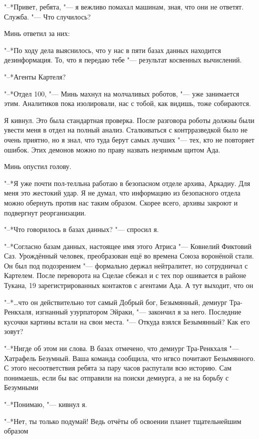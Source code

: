 \documentclass[a4paper,10pt]{book}
\newcommand{\ldotst}{\so{...}\xspace}
\begin{document}
"--*Привет, ребята, "--- я вежливо помахал машинам, зная, что они не ответят. 
Служба. "--- Что случилось?

Минь ответил за них:

"--*По ходу дела выяснилось, что у нас в пяти базах данных находится 
дезинформация. То, что я передаю тебе "--- результат косвенных вычислений.

"--*Агенты Картеля?

"--*Отдел 100, "--- Минь махнул на молчаливых роботов, "--- уже занимается 
этим. 
Аналитиков пока изолировали, нас с тобой, как видишь, тоже собираются.

Я кивнул. Это была стандартная проверка. После разговора роботы должны были 
увести меня в отдел на полный анализ. Сталкиваться с контрразведкой было не 
очень приятно, но я знал, что туда берут самых лучших "--- тех, кто не 
повторяет 
ошибок. Этих демонов можно по праву назвать незримым щитом Ада.

Минь опустил голову.

"--*Я уже почти пол-телльна работаю в безопасном отделе архива, Аркадиу. Для 
меня это жестокий удар. Я не думал, что информацию из безопасного отдела можно 
обернуть против нас таким образом. Скорее всего, архивы закроют и подвергнут 
реорганизации.

"--*Что говорилось в базах данных? "--- спросил я.

"--*Согласно базам данных, настоящее имя этого Атриса "--- Ковнелий Фиктовий 
Саз. Урождённый человек, преобразован ещё во времена Союза воронёной стали. Он 
был под подозрением "--- формально держал нейтралитет, но сотрудничал с 
Картелем. После переворота на Сцелае сбежал и с тех пор ошивается в районе 
Тукана, 19 зарегистрированных контактов с агентами Ада. А тут выходит, что 
он\ldotst

"--*\ldots что он действительно тот самый Добрый бог, Безымянный, демиург 
Тра-Ренкхаля, изгнанный узурпатором Эйраки, "--- закончил я за него. Последние 
кусочки картины встали на свои места. "--- Откуда взялся Безымянный? Как его 
зовут?

"--*Нигде об этом ни слова. В базах отмечено, что демиург Тра-Ренкхаля "--- 
Хатрафель Безумный. Ваша команда сообщила, что нгвсо почитают Безымянного. С 
этого несоответствия ребята за пару часов распутали всю историю. Сам понимаешь, 
если бы вас отправили на поиски демиурга, а не на борьбу с Безумными\ldotst

"--*Понимаю, "--- кивнул я.

"--*Нет, ты только подумай! Ведь отчёты об освоении планет тщательнейшим 
образом\ldotst
\end{document}

